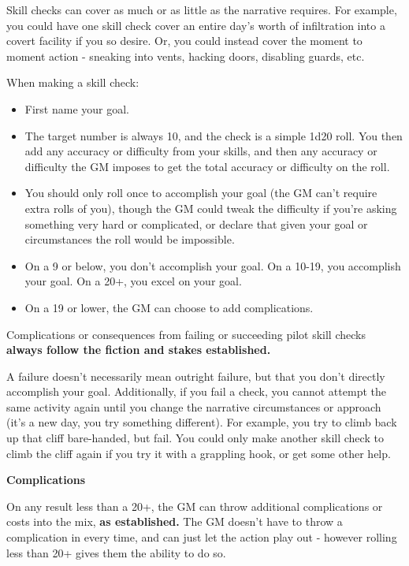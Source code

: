 Skill checks can cover as much or as little as the narrative requires. For example, you could have one skill check cover an entire day’s worth of infiltration into a covert facility if you so desire. Or, you could instead cover the moment to moment action - sneaking into vents, hacking doors, disabling guards, etc.

When making a skill check:
\begin{itemize}
\item First name your goal. 
\item The target number is always 10, and the check is a simple 1d20 roll. You then add any accuracy or difficulty from your skills, and then any accuracy or difficulty the GM imposes to get the total accuracy or difficulty on the roll. 
\item You should only roll once to accomplish your goal (the GM can’t require extra rolls of you), though the GM could tweak the difficulty if you’re asking something very hard or complicated, or declare that given your goal or circumstances the roll would be impossible. 
\item On a 9 or below, you don’t accomplish your goal. On a 10-19, you accomplish your goal. On a 20+, you excel on your goal. 
\item On a 19 or lower, the GM can choose to add complications.
\end{itemize}  

Complications or consequences from failing or succeeding pilot skill checks \textbf{always follow the fiction and stakes established.} 


A failure doesn’t necessarily mean outright failure, but that you don’t directly accomplish your goal. Additionally, if you fail a check, you cannot attempt the same activity again until you change the narrative circumstances or approach (it’s a new day, you try something different). For example, you try to climb back up that cliff bare-handed, but fail. You could only make another skill check to climb the cliff again if you try it with a grappling hook, or get some other help.

\begin{center}
\textbf{Complications}
\end{center}

On any result less than a 20+, the GM can throw additional complications or costs into the mix, \textbf{as established.} The GM doesn’t have to throw a complication in every time, and can just let the action play out - however rolling less than 20+ gives them the ability to do so. 

